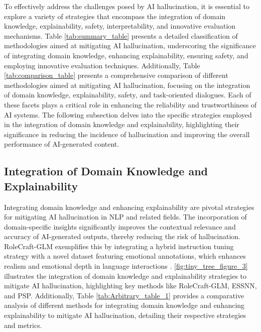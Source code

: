 

To effectively address the challenges posed by AI hallucination, it is essential to explore a variety of strategies that encompass the integration of domain knowledge, explainability, safety, interpretability, and innovative evaluation mechanisms. Table \ref{tab:summary_table} presents a detailed classification of methodologies aimed at mitigating AI hallucination, underscoring the significance of integrating domain knowledge, enhancing explainability, ensuring safety, and employing innovative evaluation techniques. Additionally, Table \ref{tab:comparison_table} presents a comprehensive comparison of different methodologies aimed at mitigating AI hallucination, focusing on the integration of domain knowledge, explainability, safety, and task-oriented dialogues. Each of these facets plays a critical role in enhancing the reliability and trustworthiness of AI systems. The following subsection delves into the specific strategies employed in the integration of domain knowledge and explainability, highlighting their significance in reducing the incidence of hallucination and improving the overall performance of AI-generated content.









\subsection{Integration of Domain Knowledge and Explainability} \label{subsec:Integration of Domain Knowledge and Explainability}



Integrating domain knowledge and enhancing explainability are pivotal strategies for mitigating AI hallucination in NLP and related fields. The incorporation of domain-specific insights significantly improves the contextual relevance and accuracy of AI-generated outputs, thereby reducing the risk of hallucination. RoleCraft-GLM exemplifies this by integrating a hybrid instruction tuning strategy with a novel dataset featuring emotional annotations, which enhances realism and emotional depth in language interactions \cite{tao2024rolecraftglmadvancingpersonalizedroleplaying}. \autoref{fig:tiny_tree_figure_3} illustrates the integration of domain knowledge and explainability strategies to mitigate AI hallucination, highlighting key methods like RoleCraft-GLM, ESSNN, and PSP. Additionally, Table \ref{tab:Arbitrary_table_1} provides a comparative analysis of different methods for integrating domain knowledge and enhancing explainability to mitigate AI hallucination, detailing their respective strategies and metrics.

